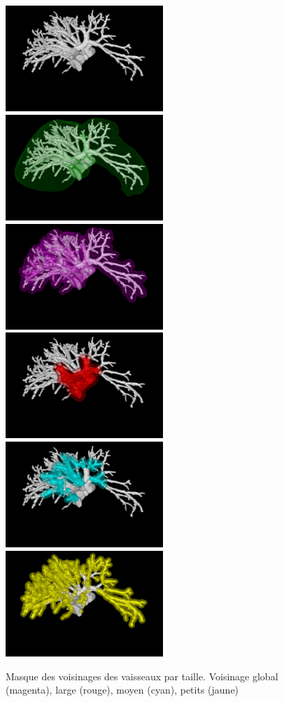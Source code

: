 \begin{figure}[!ht]
  \centering
  \includegraphics[height=4cm]{Images/vs_gt.png}
  \includegraphics[height=4cm]{Images/vs_gt_liver.png}
  \includegraphics[height=4cm]{Images/vs_VN.png}
  \includegraphics[height=4cm]{Images/vs_large.png}
  \includegraphics[height=4cm]{Images/vs_medium.png}
  \includegraphics[height=4cm]{Images/vs_small.png}
  \caption{Masque des voisinages des vaisseaux par taille. Voisinage global (magenta), large (rouge), moyen (cyan), petits (jaune)}
  \label{fig:vs_masks}
\end{figure}

